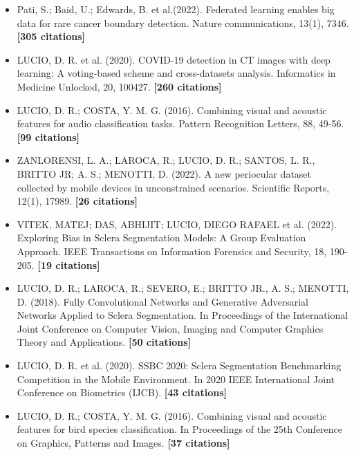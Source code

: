 \documentclass[12pt,a4paper,sans]{moderncv}        %
\begin{document}
\begin{itemize}

\item Pati, S.; Baid, U.; Edwards, B. et al.(2022). Federated learning enables big data for rare cancer boundary detection. Nature communications, 13(1), 7346. \textbf{[305 citations]}

\item LUCIO, D. R. et al. (2020). COVID-19 detection in CT images with deep learning: A voting-based scheme and cross-datasets analysis. Informatics in Medicine Unlocked, 20, 100427. \textbf{[260 citations]}

\item LUCIO, D. R.; COSTA, Y. M. G. (2016). Combining visual and acoustic features for audio classification tasks. Pattern Recognition Letters, 88, 49-56. \textbf{[99 citations]}

\item ZANLORENSI, L. A.; LAROCA, R.; LUCIO, D. R.; SANTOS, L. R., BRITTO JR; A. S.; MENOTTI, D. (2022). A new periocular dataset collected by mobile devices in unconstrained scenarios. Scientific Reports, 12(1), 17989. \textbf{[26 citations]}

\item VITEK, MATEJ; DAS, ABHIJIT; LUCIO, DIEGO RAFAEL et al. (2022). Exploring Bias in Sclera Segmentation Models: A Group Evaluation Approach. IEEE Transactions on Information Forensics and Security, 18, 190-205. \textbf{[19 citations]}

\item LUCIO, D. R.; LAROCA, R.; SEVERO, E.; BRITTO JR., A. S.; MENOTTI, D. (2018). Fully Convolutional Networks and Generative Adversarial Networks Applied to Sclera Segmentation. In Proceedings of the International Joint Conference on Computer Vision, Imaging and Computer Graphics Theory and Applications. \textbf{[50 citations]}

\item LUCIO, D. R. et al. (2020). SSBC 2020: Sclera Segmentation Benchmarking Competition in the Mobile Environment. In 2020 IEEE International Joint Conference on Biometrics (IJCB). \textbf{[43 citations]}

\item LUCIO, D. R.; COSTA, Y. M. G. (2016). Combining visual and acoustic features for bird species classification. In Proceedings of the 25th Conference on Graphics, Patterns and Images. \textbf{[37 citations]}

\end{itemize}
\end{document}
